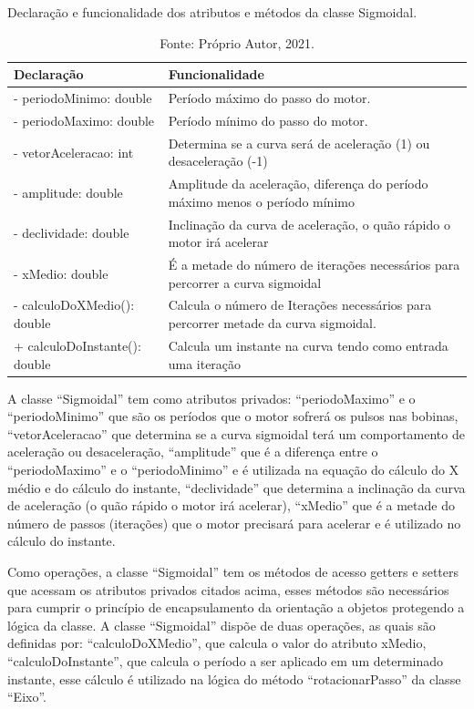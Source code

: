 \begin{table}
    \centering
    \caption{Declaração e funcionalidade dos atributos e métodos da classe Sigmoidal.}
    \begin{tabular}{lp{9cm}}
        \hline
        \textbf{Declaração} & \textbf{Funcionalidade}\\
        \hline
        - periodoMinimo: double & Período máximo do passo do motor.\\
        - periodoMaximo: double & Período mínimo do passo do motor.\\
        - vetorAceleracao: int & Determina se a curva será de aceleração (1) ou desaceleração (-1)\\
        - amplitude: double & Amplitude da aceleração, diferença do período máximo menos o período mínimo\\
        - declividade: double & Inclinação da curva de aceleração, o quão rápido o motor irá acelerar\\
        - xMedio: double & É a metade do número de iterações necessários para percorrer a curva sigmoidal\\
        - calculoDoXMedio(): double & Calcula o número de Iterações necessários para percorrer metade da curva sigmoidal.\\
        + calculoDoInstante(): double & Calcula um instante na curva tendo como entrada uma iteração\\
        \hline       
    \end{tabular}
    \caption*{Fonte: Próprio Autor, 2021.}
    \label{tab:classesigmoidal}
\end{table}

A classe “Sigmoidal” tem como atributos privados: “periodoMaximo” e o “periodoMinimo” que são os períodos 
que o motor sofrerá os pulsos nas bobinas, “vetorAceleracao” que determina se a curva sigmoidal terá 
um comportamento de aceleração ou desaceleração, “amplitude” que é a diferença entre o “periodoMaximo” 
e o “periodoMinimo” e é utilizada na equação do cálculo do X médio e do cálculo do instante, “declividade” 
que determina a inclinação da curva de aceleração (o quão rápido o motor irá acelerar), “xMedio” que é a 
metade do número de passos (iterações) que o motor precisará para acelerar e é utilizado no cálculo 
do instante. 

Como operações, a classe “Sigmoidal” tem os métodos de acesso getters e setters que acessam os atributos 
privados citados acima, esses métodos são necessários para cumprir o princípio de encapsulamento da orientação 
a objetos protegendo a lógica da classe. A classe “Sigmoidal” dispõe de duas operações, as quais são definidas 
por: “calculoDoXMedio”, que calcula o valor do atributo xMedio, “calculoDoInstante”, que calcula o período a 
ser aplicado em um determinado instante, esse cálculo é utilizado na lógica do método “rotacionarPasso” 
da classe “Eixo”.

